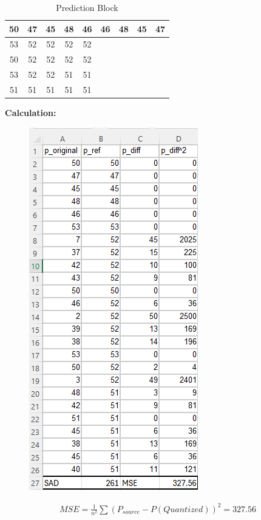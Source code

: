 \documentclass[letterpaper, 12pt]{article}
\begin{document}
\begin{table}[htbp]
    \centering
    \caption{Prediction Block}
    \begin{tabular}{|c|c|c|c|c|c|c|c|c|} \hline 
         50&  47&  45&  48&  46&  46&  48&  45& 47\\ \hline 
         53&  52&  52&  52&  52&  &  &  & \\ \hline 
         50&  52&  52&  52&  52&  &  &  & \\ \hline 
         53&  52&  52&  51&  51&  &  &  & \\ \hline 
         51&  51&  51&  51&  51&  &  &  & \\ \hline
    \end{tabular}
\end{table}
\textbf{Calculation:\\}
\begin{figure}
    \centering
    \includegraphics[width=0.5\linewidth]{FINAL_ASSIGNMENT/V_S_3.png}
    
    
\end{figure}

\begin{align*}
    MSE = \frac{1}{n^2}\sum(P_{source}-P(Quantized))^2 = 327.56
\end{align*}
\end{document}
